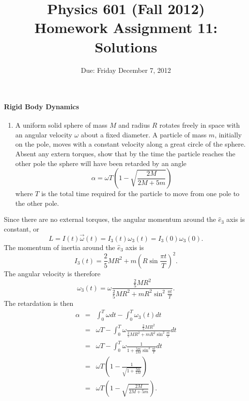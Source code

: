 \documentclass[letterpaper,11pt]{article}
\title{Physics 601 (Fall 2012) \\ Homework Assignment 11: Solutions}
\date{Due: Friday December 7, 2012}
\begin{document}
\maketitle

\paragraph*{Rigid Body Dynamics}
\begin{enumerate}
 \item A uniform solid sphere of mass $M$ and radius $R$ rotates freely in space with an angular velocity $\omega$ about a fixed diameter.  A particle of mass $m$, initially on the pole, moves with a constant velocity along a great circle of the sphere.  Absent any extern torques, show that by the time the particle reaches the other pole the sphere will have been retarded by an angle
 \begin{equation*}
  \alpha = \omega T \left( 1 - \sqrt{\frac{2M}{2M + 5m}} \right)
 \end{equation*}
 where $T$ is the total time required for the particle to move from one pole to the other pole.
\end{enumerate}
Since there are no external torques, the angular momentum around the $\hat{e}_3$ axis is constant, or
\begin{equation*}
 L = I(t) \vec{\omega}(t) = I_3(t) \omega_3(t) = I_3(0) \omega_3(0).
\end{equation*}
The momentum of inertia around the $\hat{e}_3$ axis is
\begin{equation*}
 I_3(t) = \frac{2}{5}MR^2 + m\left(R\sin\frac{\pi t}{T}\right)^2.
\end{equation*}
The angular velocity is therefore
\begin{equation*}
 \omega_3(t) = \omega \frac{\frac{2}{5}MR^2}{\frac{2}{5}MR^2 + mR^2\sin^2\frac{\pi t}{T}}.
\end{equation*}
The retardation is then
\begin{eqnarray*}
 \alpha & = & \int_0^T \omega dt - \int_0^T \omega_3(t) dt \\
 & = & \omega T - \int_0^T \omega \frac{\frac{2}{5}MR^2}{\frac{2}{5}MR^2 + mR^2\sin^2\frac{\pi t}{T}} dt \\
 & = & \omega T - \int_0^T \omega \frac{1}{1 + \frac{5m}{2M}\sin^2\frac{\pi t}{T}} dt \\
 & = & \omega T \left(1 - \frac{1}{\sqrt{1 + \frac{5m}{2M}}} \right) \\
 & = & \omega T \left(1 - \sqrt{\frac{2M}{2M + 5m}} \right).
\end{eqnarray*}
\end{document}
